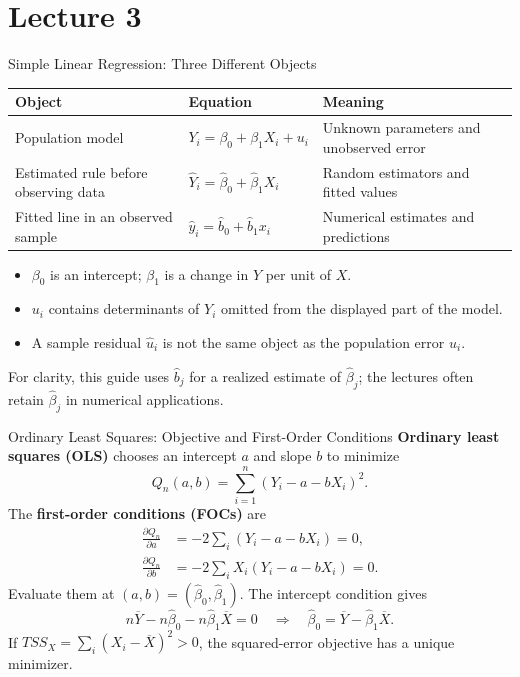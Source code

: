 \documentclass[10pt,aspectratio=169]{beamer}
\begin{document}
\section{Lecture 3}
\begin{frame}{Simple Linear Regression: Three Different Objects}
\small
\begin{center}
\begin{tabular}{>{\raggedright\arraybackslash}p{3.2cm}>{\raggedright\arraybackslash}p{5.4cm}>{\raggedright\arraybackslash}p{4.6cm}}
\toprule
Object & Equation & Meaning\\
\midrule
Population model & $Y_i=\beta_0+\beta_1X_i+u_i$ & Unknown parameters and unobserved error\\[9pt]
Estimated rule before observing data & $\widehat Y_i=\widehat\beta_0+\widehat\beta_1X_i$ & Random estimators and fitted values\\[9pt]
Fitted line in an observed sample & $\widehat y_i=\widehat b_0+\widehat b_1x_i$ & Numerical estimates and predictions\\
\bottomrule
\end{tabular}
\end{center}
\begin{itemize}
\item $\beta_0$ is an intercept; $\beta_1$ is a change in $Y$ per unit of $X$.
\item $u_i$ contains determinants of $Y_i$ omitted from the displayed part of the model.
\item A sample residual $\widehat u_i$ is not the same object as the population error $u_i$.
\end{itemize}
For clarity, this guide uses $\widehat b_j$ for a realized estimate of $\widehat\beta_j$; the lectures often retain $\widehat\beta_j$ in numerical applications.
\end{frame}

\begin{frame}{Ordinary Least Squares: Objective and First-Order Conditions}
\small
\textbf{Ordinary least squares (OLS)} chooses an intercept $a$ and slope $b$ to minimize
\[
Q_n(a,b)=\sum_{i=1}^n(Y_i-a-bX_i)^2.
\]
The \textbf{first-order conditions (FOCs)} are
\begin{align*}
\frac{\partial Q_n}{\partial a}
&=-2\sum_i(Y_i-a-bX_i)=0,\\
\frac{\partial Q_n}{\partial b}
&=-2\sum_iX_i(Y_i-a-bX_i)=0.
\end{align*}
Evaluate them at $(a,b)=(\widehat\beta_0,\widehat\beta_1)$.
The intercept condition gives
\[
n\overline Y-n\widehat\beta_0-n\widehat\beta_1\overline X=0
\quad\Longrightarrow\quad
\boxed{\widehat\beta_0=\overline Y-\widehat\beta_1\overline X}.
\]
If $TSS_X=\sum_i(X_i-\overline X)^2>0$, the squared-error objective has a unique minimizer.
\end{frame}
\end{document}
